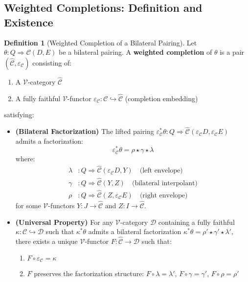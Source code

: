 \documentclass[11pt]{article}
\theoremstyle{plain}
\theoremstyle{definition}
\newtheorem{definition}[theorem]{Definition}
\theoremstyle{remark}
\newcommand{\V}{\mathcal{V}}
\begin{document}
\subsection{Weighted Completions: Definition and Existence}

\begin{definition}[Weighted Completion of a Bilateral Pairing]\label{def:weighted-completion}
Let $\theta : Q \Rightarrow \mathcal{C}(D,E)$ be a bilateral pairing. A \textbf{weighted completion} of $\theta$ is a pair $(\widehat{\mathcal{C}}, \varepsilon_{\mathcal{C}})$ consisting of:
\begin{enumerate}
\item A $\V$-category $\widehat{\mathcal{C}}$
\item A fully faithful $\V$-functor $\varepsilon_{\mathcal{C}} : \mathcal{C} \hookrightarrow \widehat{\mathcal{C}}$ (completion embedding)
\end{enumerate}
satisfying:

\begin{itemize}
\item \textbf{(Bilateral Factorization)} The lifted pairing $\varepsilon_{\mathcal{C}}^* \theta : Q \Rightarrow \widehat{\mathcal{C}}(\varepsilon_{\mathcal{C}} D, \varepsilon_{\mathcal{C}} E)$ admits a factorization:
$$\varepsilon_{\mathcal{C}}^* \theta = \rho \star \gamma \star \lambda$$
where:
\begin{align}
\lambda &: Q \Rightarrow \widehat{\mathcal{C}}(\varepsilon_{\mathcal{C}} D, Y) \quad \text{(left envelope)} \\
\gamma &: Q \Rightarrow \widehat{\mathcal{C}}(Y, Z) \quad \text{(bilateral interpolant)} \\
\rho &: Q \Rightarrow \widehat{\mathcal{C}}(Z, \varepsilon_{\mathcal{C}} E) \quad \text{(right envelope)}
\end{align}
for some $\V$-functors $Y : J \to \widehat{\mathcal{C}}$ and $Z : I \to \widehat{\mathcal{C}}$.

\item \textbf{(Universal Property)} For any $\V$-category $\mathcal{D}$ containing a fully faithful $\kappa : \mathcal{C} \hookrightarrow \mathcal{D}$ such that $\kappa^* \theta$ admits a bilateral factorization $\kappa^* \theta = \rho' \star \gamma' \star \lambda'$, there exists a unique $\V$-functor $F : \widehat{\mathcal{C}} \to \mathcal{D}$ such that:
\begin{enumerate}
\item $F \circ \varepsilon_{\mathcal{C}} = \kappa$
\item $F$ preserves the factorization structure: $F \circ \lambda = \lambda'$, $F \circ \gamma = \gamma'$, $F \circ \rho = \rho'$
\end{enumerate}
\end{itemize}
\end{definition}
\end{document}
